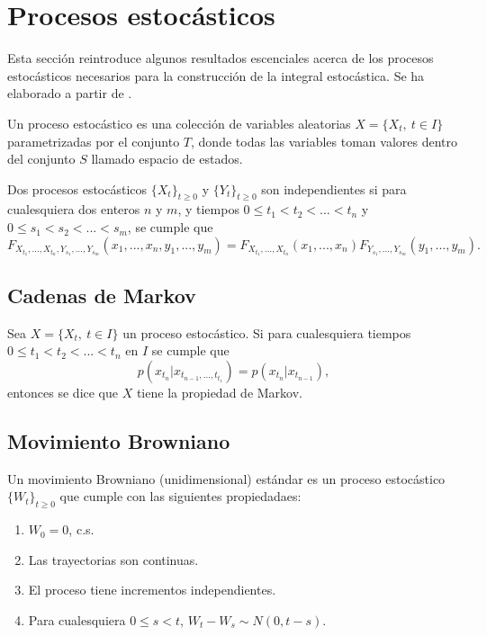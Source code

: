\section{Procesos estocásticos}

Esta sección reintroduce algunos resultados escenciales acerca de 
los procesos estocásticos necesarios para la construcción de la integral
estocástica. Se ha elaborado a partir de 
\cite{rinconIntroduccionProcesosEstocasticos2012,dobrowIntroductionStochasticProcesses2016}.

\begin{definition}\label{def:proceso_estocastico}
    Un proceso estocástico es una colección de variables
    aleatorias $X = \{X_t,\ t\in I\}$ parametrizadas por el
    conjunto $T$, donde todas las variables toman valores
    dentro del conjunto $S$ llamado espacio de estados. 
\end{definition}

\begin{definition}
    Dos procesos estocásticos $\{X_t\}_{t\geq 0}$ y 
    $\{Y_t\}_{t\geq 0}$ son independientes si para cualesquiera dos enteros 
    $n$ y $m$, y tiempos $0\leq t_1<t_2<...<t_n$ y $0\leq s_1<s_2<...<s_m$, 
    se cumple que 
    $$F_{X_{t_1},...,X_{t_n},Y_{s_1},...,Y_{s_m}}(x_1,...,x_n,y_1,...,y_m)=F_{X_{t_1},...,X_{t_n}}(x_1,...,x_n)F_{Y_{s_1},...,Y_{s_m}}(y_1,...,y_m).$$
\end{definition}

\subsection{Cadenas de Markov}

\begin{definition}
    Sea $X = \{X_t,\ t\in I\}$ un proceso estocástico. Si 
    para cualesquiera tiempos $0\leq t_1<t_2<...<t_n$
    en $I$ se cumple que 
    $$p(x_{t_n}|x_{t_{n-1},...,t_{t_1}})=p(x_{t_n}|x_{t_{n-1}}),$$
    entonces se dice que $X$ tiene la propiedad de Markov.
\end{definition}

\subsection{Movimiento Browniano}

\begin{definition}
    Un movimiento Browniano (unidimensional) estándar es un proceso 
    estocástico $\{W_t\}_{t\geq0}$ que cumple con las siguientes 
    propiedadaes:
    \begin{enumerate}
        \item $W_0=0$, c.s.
        \item Las trayectorias son continuas.
        \item El proceso tiene incrementos independientes. 
        \item Para cualesquiera $0\leq s<t$, $W_t-W_s\sim N(0,t-s)$.
    \end{enumerate}
\end{definition}

